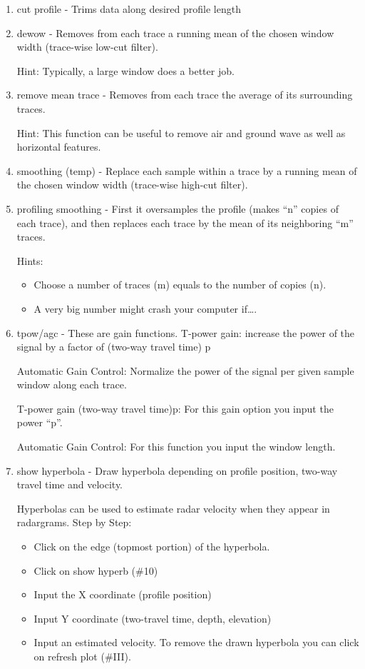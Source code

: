 \documentclass[12pt]{article}
\begin{document}
\begin{enumerate}
\item cut profile - Trims data along desired profile length 

\item  dewow - Removes from each trace a running mean of the chosen window width (trace-wise low-cut filter). 

Hint: Typically, a large window does a better job.


\item remove mean trace - Removes from each trace the average of its surrounding traces.

Hint: This function can be useful to remove air and ground wave as well as horizontal features.

\item smoothing (temp) - Replace each sample within a trace by a running mean of the chosen window width (trace-wise high-cut filter).

\item profiling smoothing - First it oversamples the profile (makes “n” copies of each trace), and then replaces each trace by the mean of its neighboring “m” traces. 

Hints:
\begin{itemize}
\item Choose a number of traces (m) equals to the number of copies (n).
\item A very big number might crash your computer if….
\end{itemize}


\item tpow/agc - These are gain functions. 
     T-power gain: increase the power of the signal by a factor of (two-way travel time) p
     
Automatic Gain Control: Normalize the power of the signal per given sample window along each trace. 

T-power gain (two-way travel time)p:
For this gain option you input the power “p”.

Automatic Gain Control: 
For this function you input the window length.

\item show hyperbola - Draw hyperbola depending on profile position, two-way travel time and velocity. 

Hyperbolas can be used to estimate radar velocity when they appear in radargrams. 
Step by Step:
\begin{itemize}
\item Click on the edge (topmost portion) of the hyperbola.
\item Click on show hyperb (\#10)
\item Input the X coordinate (profile position)
\item Input Y coordinate (two-travel time, depth, elevation)
\item Input an estimated velocity.
To remove the drawn hyperbola you can click on refresh plot (\#III).
\end{itemize}


\end{enumerate}
\end{document}
